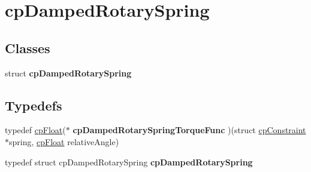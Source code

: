 \hypertarget{group__cp_damped_rotary_spring}{\section{cp\-Damped\-Rotary\-Spring}
\label{group__cp_damped_rotary_spring}
}
\subsection*{Classes}
\begin{DoxyCompactItemize}
\item 
struct {\bfseries cp\-Damped\-Rotary\-Spring}
\end{DoxyCompactItemize}
\subsection*{Typedefs}
\begin{DoxyCompactItemize}
\item 
\hypertarget{group__cp_damped_rotary_spring_ga50b01cde4eb76148e5f59da118999ade}{typedef \hyperlink{group__basic_types_gac1ed65573e035bf892505768c852d8d3}{cp\-Float}($\ast$ {\bfseries cp\-Damped\-Rotary\-Spring\-Torque\-Func} )(struct \hyperlink{structcp_constraint}{cp\-Constraint} $\ast$spring, \hyperlink{group__basic_types_gac1ed65573e035bf892505768c852d8d3}{cp\-Float} relative\-Angle)}\label{group__cp_damped_rotary_spring_ga50b01cde4eb76148e5f59da118999ade}

\item 
\hypertarget{group__cp_damped_rotary_spring_ga9f4f3421778c50c357c4b9a2f8d82279}{typedef struct cp\-Damped\-Rotary\-Spring {\bfseries cp\-Damped\-Rotary\-Spring}}\label{group__cp_damped_rotary_spring_ga9f4f3421778c50c357c4b9a2f8d82279}

\end{DoxyCompactItemize}
